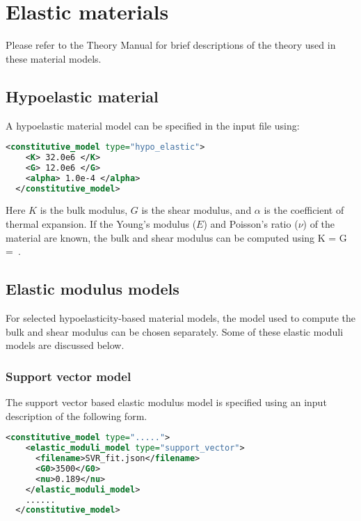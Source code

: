 \section{Elastic materials}
Please refer to the \Vaango Theory Manual for brief descriptions of the theory used in 
these material models.

\subsection{Hypoelastic material}
A hypoelastic material model can be specified in the  input file using:
\begin{lstlisting}[language=XML]
  <constitutive_model type="hypo_elastic">
    <K> 32.0e6 </K>
    <G> 12.0e6 </G>
    <alpha> 1.0e-4 </alpha>
  </constitutive_model>
\end{lstlisting}

Here $K$ is the bulk modulus, $G$ is the shear modulus, and $\alpha$ is the coefficient
of thermal expansion.  If the Young's modulus ($E$) and Poisson's ratio ($\nu$) of the 
material are known, the bulk and shear modulus can be computed using
\Beq
  K =  \quad \Tand \quad
  G =  \,.
\Eeq

\subsection{Elastic modulus models}
For selected hypoelasticity-based material models, the model used to compute the bulk and shear modulus 
can be chosen separately.  Some of these elastic moduli models are discussed below.

\subsubsection{Support vector model}
The support vector based elastic modulus model is specified using an input
description of the following form.
\begin{lstlisting}[language=XML]
  <constitutive_model type=".....">
    <elastic_moduli_model type="support_vector">
      <filename>SVR_fit.json</filename>
      <G0>3500</G0>
      <nu>0.189</nu>
    </elastic_moduli_model>
    ......
  </constitutive_model>
\end{lstlisting}

